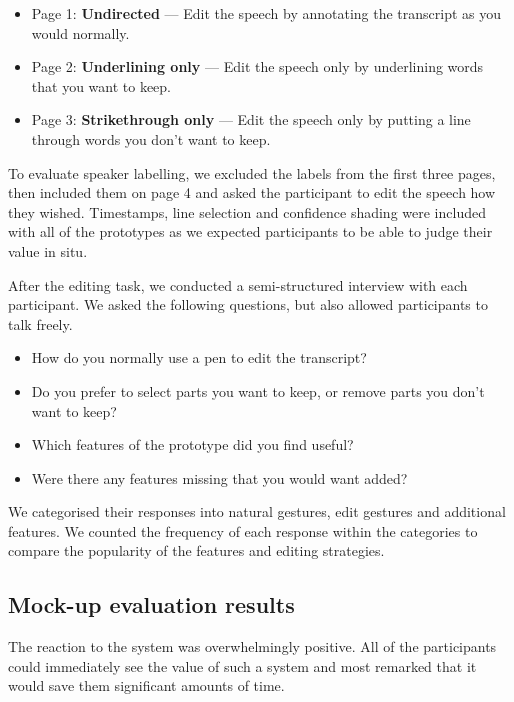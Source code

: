 \begin{itemize}
  \item Page 1: \textbf{Undirected} --- Edit the speech by annotating the transcript as you would normally.
  \item Page 2: \textbf{Underlining only} --- Edit the speech only by underlining words that you want to keep.
  \item Page 3: \textbf{Strikethrough only} --- Edit the speech only by putting a line through words you don't
        want to keep.
\end{itemize}

To evaluate speaker labelling, we excluded the labels from the first three pages, then included them on page 4
and asked the participant to edit the speech how they wished.  Timestamps, line selection and confidence shading were
included with all of the prototypes as we expected participants to be able to judge their value in situ.

After the editing task, we conducted a semi-structured interview with each participant.
We asked the following questions, but also allowed participants to talk freely.

{\singlespacing
  \begin{itemize}
    \item How do you normally use a pen to edit the transcript?
    \item Do you prefer to select parts you want to keep, or remove parts you don't want to keep?
    \item Which features of the prototype did you find useful?
    \item Were there any features missing that you would want added?
  \end{itemize}
}

We categorised their responses into natural gestures, edit gestures and additional features. We counted the frequency
of each response within the categories to compare the popularity of the features and editing strategies.



\subsection{Mock-up evaluation results}

The reaction to the system was overwhelmingly positive. All of the participants could immediately see the value of such
a system and most remarked that it would save them significant amounts of time.

